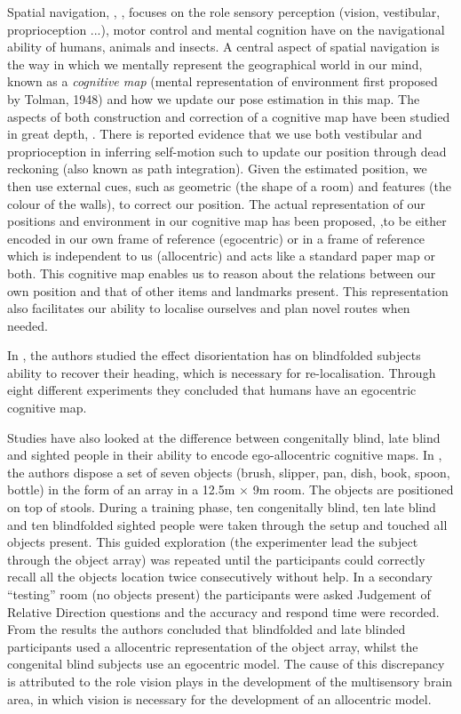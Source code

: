 Spatial navigation, \cite{Wang_2007}, \cite{what_det_our_nav_ability_2010}, focuses on the role sensory perception 
(vision, vestibular, proprioception ...), motor control and mental cognition have on the navigational ability of  
humans, animals and insects. A central aspect of spatial navigation is the way in which we mentally represent the geographical world in our mind, known as a \textit{cognitive map} (mental representation of environment first proposed by Tolman, 1948)
and how we update our pose estimation in this map. The aspects of both  construction and correction of a cognitive 
map have been studied in great depth, \cite{spatial_updating_2008}.
There is reported evidence that we use both vestibular and proprioception in inferring self-motion such to update our position through dead reckoning (also known as path integration). 
Given the estimated position, we then use external cues, such as geometric (the shape of a room) and features (the colour of the walls), 
to correct our position. The actual representation of our positions and environment in our cognitive map has been proposed,
\cite{spatial_memory_how_ego_allo_combine_2006},to be either encoded in our own frame of reference (egocentric) or in a frame of reference which 
is independent to us (allocentric) and acts like a standard paper map or both. This cognitive map enables us to reason about the relations between our own position and that of other items and landmarks present. 
This representation also facilitates our ability to localise ourselves and plan novel routes when needed.

In \cite{updating_egocentric_human_navigation_2000}, the authors studied the effect disorientation has on blindfolded subjects ability 
to recover their heading, which is necessary for re-localisation. Through eight different experiments they concluded that humans have an egocentric cognitive map.


Studies have also looked at the difference between congenitally blind, late blind and sighted people in their ability to encode ego-allocentric cognitive maps.
In \cite{Pasqualotto2013175}, the authors dispose a set of seven objects (brush, slipper, pan, dish, book, spoon, bottle) in the form of 
an array in a 12.5m $\times$ 9m room. The objects are positioned on top of stools. During a training phase, ten congenitally blind, ten late blind and ten blindfolded sighted people were taken through 
the setup and touched all objects present. This guided exploration (the experimenter lead the subject through the object array) was repeated until 
the participants could correctly recall all the objects location twice consecutively without help. In a secondary ``testing'' room (no objects present) 
the participants were asked Judgement of Relative Direction questions and the accuracy and respond time were recorded. From the results the authors 
concluded that blindfolded and late blinded participants used a allocentric representation of the object array, whilst the congenital blind 
subjects use an egocentric model. The cause of this discrepancy is attributed to the role vision plays in the development of the multisensory brain area, in
which vision is necessary for the development of an allocentric model. 


